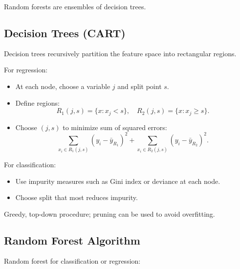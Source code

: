 \documentclass[11pt]{article}
\begin{document}
Random forests are ensembles of decision trees.

\subsection{Decision Trees (CART)}

Decision trees recursively partition the feature space into rectangular regions.

For regression:
\begin{itemize}
    \item At each node, choose a variable $j$ and split point $s$.
    \item Define regions:
    \[
        R_1(j,s) = \{x : x_j < s\},\quad
        R_2(j,s) = \{x : x_j \ge s\}.
    \]
    \item Choose $(j,s)$ to minimize sum of squared errors:
    \[
        \sum_{x_i \in R_1(j,s)} (y_i - \bar{y}_{R_1})^2
        + \sum_{x_i \in R_2(j,s)} (y_i - \bar{y}_{R_2})^2.
    \]
\end{itemize}

For classification:
\begin{itemize}
    \item Use impurity measures such as Gini index or deviance at each node.
    \item Choose split that most reduces impurity.
\end{itemize}

Greedy, top-down procedure; pruning can be used to avoid overfitting.

\subsection{Random Forest Algorithm}

Random forest for classification or regression:
\end{document}
